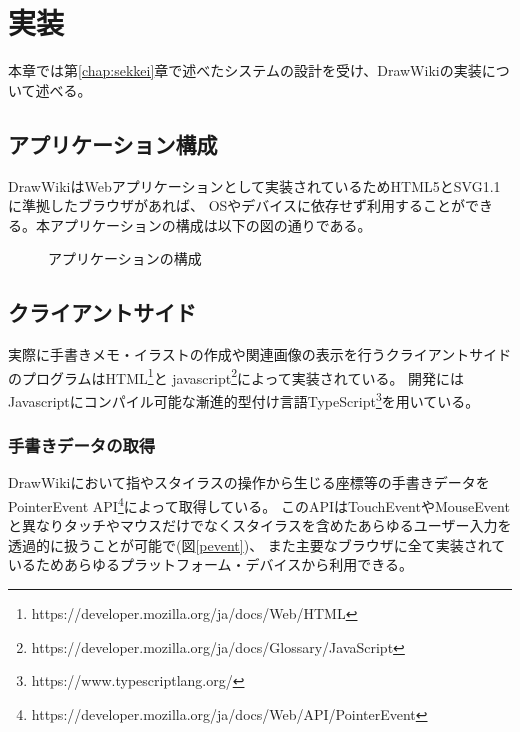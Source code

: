 \chapter{実装}
\label{chap:zissou}

本章では第\ref{chap:sekkei}章で述べたシステムの設計を受け、DrawWikiの実装について述べる。

\newpage

\section{アプリケーション構成}
DrawWikiはWebアプリケーションとして実装されているためHTML5とSVG1.1に準拠したブラウザがあれば、
OSやデバイスに依存せず利用することができる。本アプリケーションの構成は以下の図の通りである。

\begin{figure}[htbp]
    \begin{center}
         \end{center}
    \caption{アプリケーションの構成}
\end{figure}

\section{クライアントサイド}
実際に手書きメモ・イラストの作成や関連画像の表示を行うクライアントサイドのプログラムはHTML\footnote{https://developer.mozilla.org/ja/docs/Web/HTML}と
javascript\footnote{https://developer.mozilla.org/ja/docs/Glossary/JavaScript}によって実装されている。
開発にはJavascriptにコンパイル可能な漸進的型付け言語TypeScript\footnote{https://www.typescriptlang.org/}を用いている。

\subsection{手書きデータの取得}
DrawWikiにおいて指やスタイラスの操作から生じる座標等の手書きデータをPointerEvent API\footnote{https://developer.mozilla.org/ja/docs/Web/API/PointerEvent}によって取得している。
このAPIはTouchEventやMouseEventと異なりタッチやマウスだけでなくスタイラスを含めたあらゆるユーザー入力を透過的に扱うことが可能で(図\ref{pevent})、
また主要なブラウザに全て実装されているためあらゆるプラットフォーム・デバイスから利用できる。

